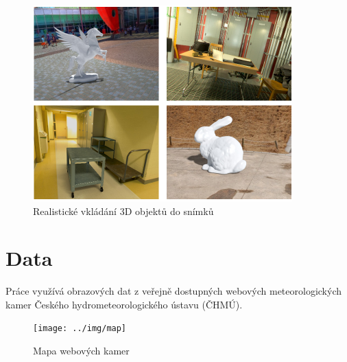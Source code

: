 \begin{figure}[htb]\centering
    \includegraphics[width=100mm]{../img/3d}
    \caption{Realistické vkládání 3D objektů do snímků \citep{deepcalib}}
\end{figure}





\chapter{Data}
Práce využívá obrazových dat z veřejně dostupných webových meteorologických kamer Českého hydrometeorologického ústavu (ČHMÚ).
\begin{figure}[h]\centering
    \texttt{[image: ../img/map]}
    \caption{Mapa webových kamer \cite{chmu}}

\end{figure}
